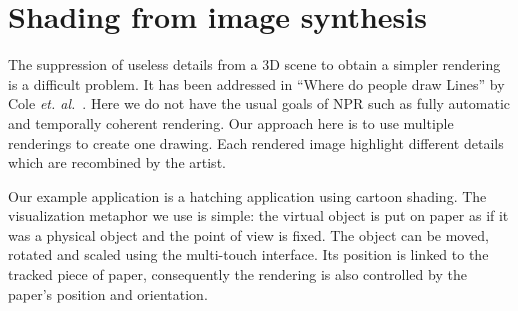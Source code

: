 \documentclass{sigchi}
\begin{document}












\section{Shading from image synthesis}



The suppression of useless details from a 3D scene to obtain a simpler rendering
is a difficult problem. It has been addressed in ``Where do people draw
Lines'' by Cole \textit{et. al.}~\cite{cole2008people}. 
Here we do not have the usual goals of NPR such as fully automatic and
temporally coherent rendering. 
Our approach here is to use multiple renderings to create one
drawing. Each rendered image highlight different details which are
recombined by the artist. 


Our example application is a hatching application using cartoon shading. 
The visualization metaphor we use is simple: the virtual object
is put on paper as if it was a physical object and the point of view
is fixed. 
The object can be moved, rotated and scaled using the multi-touch
interface. Its position is linked to the tracked piece of paper,
consequently the rendering is also controlled by the paper's position
and orientation. 
\end{document}
